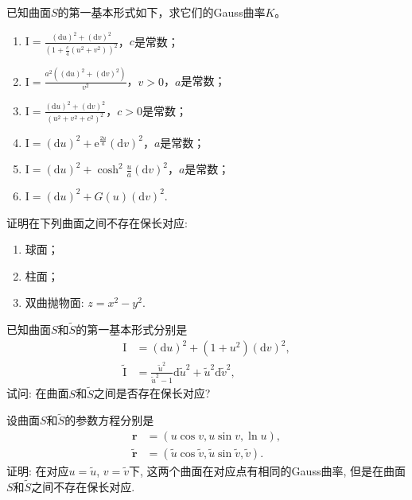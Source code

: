 \documentclass[../../main.tex]{subfiles}%
\begin{document}
\begin{example}
已知曲面$S$的第一基本形式如下，求它们的Gauss曲率$K$。
\begin{enumerate}[(1)]
\item $\mathrm{I}=\frac{(\mathrm{d}u)^2+(\mathrm{d}v)^2}{\left(1+\frac{c}{4}(u^2+v^2)\right)^2}$，$c$是常数；
\item $\mathrm{I}=\frac{a^2\left((\mathrm{d}u)^2+(\mathrm{d}v)^2\right)}{v^2}$，$v>0$，$a$是常数；
\item $\mathrm{I}=\frac{(\mathrm{d}u)^2+(\mathrm{d}v)^2}{(u^2+v^2+c^2)^2}$，$c>0$是常数；
\item $\mathrm{I}=(\mathrm{d}u)^2+\mathrm{e}^{\frac{2u}{a}}(\mathrm{d}v)^2$，$a$是常数；
\item $\mathrm{I}=(\mathrm{d}u)^2+\cosh^2\frac{u}{a}(\mathrm{d}v)^2$，$a$是常数；
\item $\mathrm{I}=(\mathrm{d}u)^2+G(u)(\mathrm{d}v)^2$.
\end{enumerate}
\end{example}

\begin{example}
证明在下列曲面之间不存在保长对应:
\begin{enumerate}[(1)]
\item 球面；
\item 柱面；
\item 双曲抛物面: $z=x^2-y^2$.
\end{enumerate}
\end{example}

\begin{example}
已知曲面$S$和$\tilde{S}$的第一基本形式分别是
\begin{align*}
\mathrm{I} &= (\mathrm{d}u)^2+(1+u^2)(\mathrm{d}v)^2,\\
\tilde{\mathrm{I}} &= \frac{\tilde{u}^2}{\tilde{u}^2-1}\mathrm{d}\tilde{u}^2+\tilde{u}^2\mathrm{d}\tilde{v}^2,
\end{align*}
试问: 在曲面$S$和$\tilde{S}$之间是否存在保长对应?
\end{example}

\begin{example}
设曲面$S$和$\tilde{S}$的参数方程分别是
\begin{align*}
\boldsymbol{r} &= (u\cos v,u\sin v,\ln u),\\
\tilde{\boldsymbol{r}} &= (\tilde{u}\cos\tilde{v},\tilde{u}\sin\tilde{v},\tilde{v}).
\end{align*}
证明: 在对应$u=\tilde{u}$, $v=\tilde{v}$下, 这两个曲面在对应点有相同的Gauss曲率, 但是在曲面$S$和$\tilde{S}$之间不存在保长对应.
\end{example}
\end{document}
